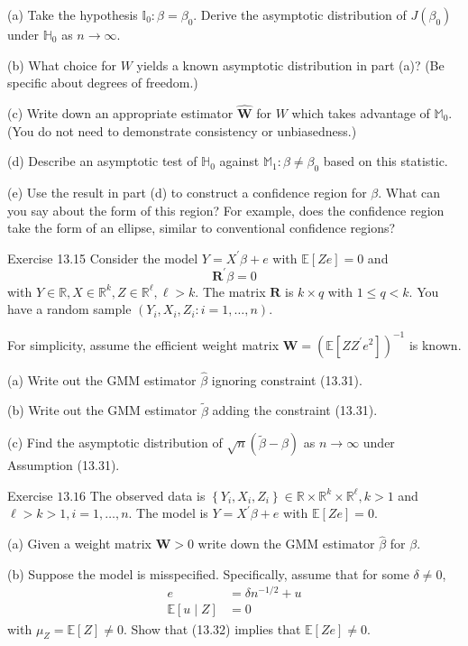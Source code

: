 \documentclass[10pt]{article}
\begin{document}
(a) Take the hypothesis $\mathbb{I}_{0}: \beta=\beta_{0}$. Derive the asymptotic distribution of $J\left(\beta_{0}\right)$ under $\mathbb{H}_{0}$ as $n \rightarrow \infty$.

(b) What choice for $W$ yields a known asymptotic distribution in part (a)? (Be specific about degrees of freedom.)

(c) Write down an appropriate estimator $\widehat{\boldsymbol{W}}$ for $W$ which takes advantage of $\mathbb{M}_{0}$. (You do not need to demonstrate consistency or unbiasedness.)

(d) Describe an asymptotic test of $\mathbb{H}_{0}$ against $\mathbb{M}_{1}: \beta \neq \beta_{0}$ based on this statistic.

(e) Use the result in part (d) to construct a confidence region for $\beta$. What can you say about the form of this region? For example, does the confidence region take the form of an ellipse, similar to conventional confidence regions?

Exercise 13.15 Consider the model $Y=X^{\prime} \beta+e$ with $\mathbb{E}[Z e]=0$ and
$$
\boldsymbol{R}^{\prime} \beta=0
$$
with $Y \in \mathbb{R}, X \in \mathbb{R}^{k}, Z \in \mathbb{R}^{\ell}, \ell>k$. The matrix $\boldsymbol{R}$ is $k \times q$ with $1 \leq q<k$. You have a random sample $\left(Y_{i}, X_{i}, Z_{i}: i=1, \ldots, n\right)$.

For simplicity, assume the efficient weight matrix $\boldsymbol{W}=\left(\mathbb{E}\left[Z Z^{\prime} e^{2}\right]\right)^{-1}$ is known.

(a) Write out the GMM estimator $\widehat{\beta}$ ignoring constraint (13.31).

(b) Write out the GMM estimator $\widetilde{\beta}$ adding the constraint (13.31).

(c) Find the asymptotic distribution of $\sqrt{n}(\widetilde{\beta}-\beta)$ as $n \rightarrow \infty$ under Assumption (13.31).

Exercise $13.16$ The observed data is $\left\{Y_{i}, X_{i}, Z_{i}\right\} \in \mathbb{R} \times \mathbb{R}^{k} \times \mathbb{R}^{\ell}, k>1$ and $\ell>k>1, i=1, \ldots, n$. The model is $Y=X^{\prime} \beta+e$ with $\mathbb{E}[Z e]=0$.

(a) Given a weight matrix $\boldsymbol{W}>0$ write down the GMM estimator $\widehat{\beta}$ for $\beta$.

(b) Suppose the model is misspecified. Specifically, assume that for some $\delta \neq 0$,
$$
\begin{aligned}
e &=\delta n^{-1 / 2}+u \\
\mathbb{E}[u \mid Z] &=0
\end{aligned}
$$
with $\mu_{Z}=\mathbb{E}[Z] \neq 0$. Show that (13.32) implies that $\mathbb{E}[Z e] \neq 0$.
\end{document}
